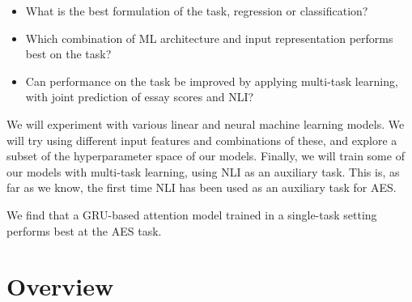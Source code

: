 \begin{itemize}
    \item What is the best formulation of the task, regression or
        classification?
    \item Which combination of \ac{ML} architecture and input representation
        performs best on the task?
    \item Can performance on the task be improved by applying multi-task
        learning, with joint prediction of essay scores and \ac{NLI}?
\end{itemize}

We will experiment with various linear and neural machine learning models. We
will try using different input features and combinations of these, and
explore a subset of the hyperparameter space of our models. Finally, we will
train some of our models with multi-task learning, using \ac{NLI} as an
auxiliary task. This is, as far as we know, the first time \ac{NLI} has been
used as an auxiliary task for \ac{AES}.

We find that a GRU-based attention model trained in a single-task setting
performs best at the AES task.


\section{Overview}

